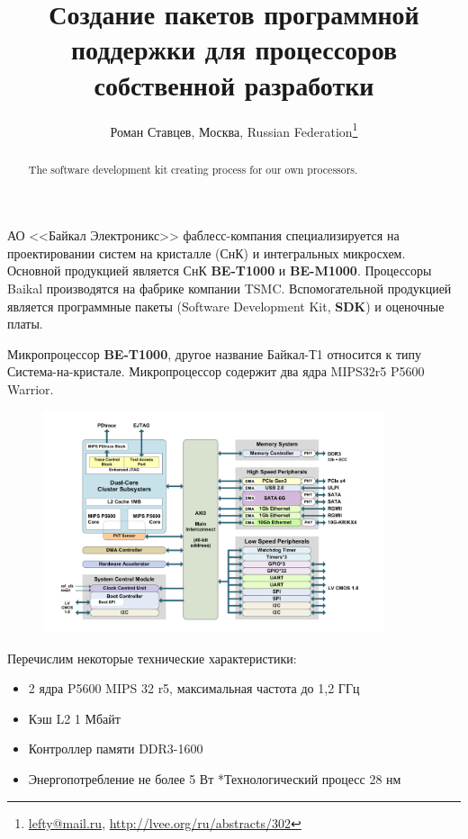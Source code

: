\documentclass[10pt, a5paper]{article}
\begin{document}
\title{Создание пакетов программной поддержки для процессоров собственной разработки}
\author{Роман Ставцев, Москва, Russian Federation\footnote{\url{lefty@mail.ru}, \url{http://lvee.org/ru/abstracts/302}}}
\maketitle
\begin{abstract}
The software development kit creating process for our own processors.
\end{abstract}
АО <<Байкал Электроникс>> фаблесс-компания специализируется на проектировании систем на кристалле (СнК) и интегральных микросхем. Основной продукцией является СнК \textbf{BE-T1000} и \textbf{BE-M1000}. Процессоры Baikal производятся на фабрике компании TSMC. Вспомогательной продукцией является программные пакеты (Software Development Kit, \textbf{SDK}) и оценочные платы.

Микропроцессор \textbf{BE-T1000}, другое название Байкал-Т1 относится к типу Система-на-кристале. Микропроцессор содержит два ядра MIPS32r5 P5600 Warrior.

\begin{center}
\begin{figure}[h!]
  \centering
  \includegraphics[width=10cm]{Stavtsev1}  
  \label{stavtsev:fig1}
\end{figure}
\end{center} 

Перечислим некоторые технические характеристики:

\begin{itemize}
  \item 2 ядра P5600 MIPS 32 r5, максимальная частота до 1,2 ГГц
  \item Кэш L2 1 Мбайт
  \item Контроллер памяти DDR3-1600
  \item Энергопотребление не более 5 Вт
*Технологический процесс 28 нм
\end{itemize}
\end{document}
